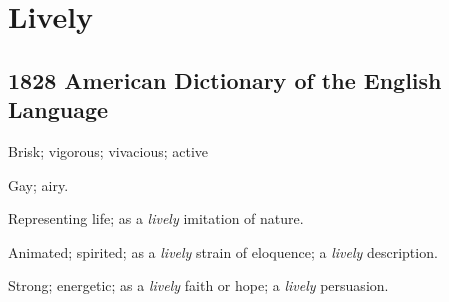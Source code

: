 \section{Lively}
	\label{LIVELY}
	

\subsection{1828 American Dictionary of the English Language} %
	\label{LIVELY-1828}

	\begin{compactitem}
		\item[1] Brisk; vigorous; vivacious; active
		\item[2] Gay; airy.
		\item[3] Representing life; as a \textit{lively} imitation of nature.
		\item[4] Animated; spirited; as a \textit{lively} strain of eloquence; a \textit{lively} description.
		\item[5] Strong; energetic; as a \textit{lively} faith or hope; a \textit{lively} persuasion.
	\end{compactitem}




	
